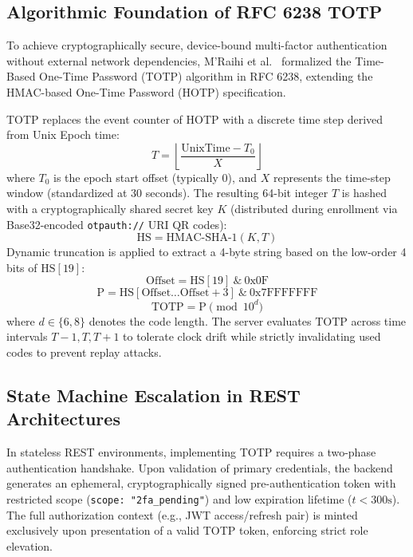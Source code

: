 \documentclass[10pt,twocolumn,a4paper]{article}
\begin{document}
\subsection{Algorithmic Foundation of RFC 6238 TOTP}
To achieve cryptographically secure, device-bound multi-factor authentication without external network dependencies, M'Raihi et al.~\cite{mraihi2011totp} formalized the Time-Based One-Time Password (TOTP) algorithm in RFC 6238, extending the HMAC-based One-Time Password (HOTP) specification.

TOTP replaces the event counter of HOTP with a discrete time step derived from Unix Epoch time:
\begin{equation}
T = \left\lfloor \frac{\text{UnixTime} - T_0}{X} \right\rfloor
\end{equation}
where $T_0$ is the epoch start offset (typically 0), and $X$ represents the time-step window (standardized at 30 seconds). The resulting 64-bit integer $T$ is hashed with a cryptographically shared secret key $K$ (distributed during enrollment via Base32-encoded \texttt{otpauth://} URI QR codes):
\begin{equation}
\text{HS} = \text{HMAC-SHA-1}(K, T)
\end{equation}
Dynamic truncation is applied to extract a 4-byte string based on the low-order 4 bits of $\text{HS}[19]$:
\begin{equation}
\text{Offset} = \text{HS}[19] \ \& \ \text{0x0F}
\end{equation}
\begin{equation}
\text{P} = \text{HS}[\text{Offset} \dots \text{Offset}+3] \ \& \ \text{0x7FFFFFFF}
\end{equation}
\begin{equation}
\text{TOTP} = \text{P} \pmod{10^d}
\end{equation}
where $d \in \{6, 8\}$ denotes the code length. The server evaluates $\text{TOTP}$ across time intervals $T-1, T, T+1$ to tolerate clock drift while strictly invalidating used codes to prevent replay attacks.

\subsection{State Machine Escalation in REST Architectures}
In stateless REST environments, implementing TOTP requires a two-phase authentication handshake. Upon validation of primary credentials, the backend generates an ephemeral, cryptographically signed pre-authentication token with restricted scope (\texttt{scope: "2fa\_pending"}) and low expiration lifetime ($t < 300\text{s}$). The full authorization context (e.g., JWT access/refresh pair) is minted exclusively upon presentation of a valid TOTP token, enforcing strict role elevation.
\end{document}
